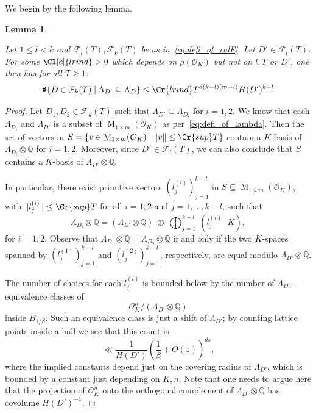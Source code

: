 \documentclass{amsart}
\newtheorem{lemma}[theorem]{Lemma}
\theoremstyle{definition}
\theoremstyle{remark}
\newcommand{\OK}{\mathcal{O}_K}
\newcommand{\Q}{\mathbb{Q}}
\DeclareMathOperator{\M}{M}
\DeclareMathOperator{\card}{\texttt{\#}}
\begin{document}
We begin by the following lemma.
\begin{lemma}
    \label{le:low_rank_induction}

    Let $1 \leq l < k$ and $\mathcal{F}_{l}(T), \mathcal{F}_{k}(T)$ be as in~\cref{eq:defi_of_calF}. 
    Let $D' \in \mathcal{F}_{l}{(T)}$.
    For some $\Cl[c]{lrind} > 0$ which 
    depends on 
    $\rho(\OK)$ but not on $l,T$ or $D'$,
    one then has for all $T \geq 1$:
    \begin{equation}
        \card \{D \in \mathcal{F}_{k}(T) \mid \Lambda_{D'} \subseteq \Lambda_{D} \} \leq \Cr{lrind}T^{d(k-l)(m-l)} H(D')^{k-l}
    \end{equation}
\end{lemma}
\begin{proof}
    Let $D_1,D_2\in \mathcal{F}_{k}(T)$ such that $\Lambda_{D'} \subseteq \Lambda_{D_i}$ for $i=1,2$. 
    We know that each $\Lambda_{D_{i}}$ and $\Lambda_{D'}$ is a subset of $\M_{1 \times m}(\OK)$
    as per~\cref{eq:defi_of_lambda}.
    Then the set of vectors in $S=\{v \in \M_{1 \times m}(\OK) \mid  \|v\| \leq \Cr{sup} T\}$
    contain a $K$-basis of $\Lambda_{D_i} \otimes \mathbb{Q}$ for $i=1,2$. 
    Moreover, since $D' \in \mathcal{F}_{l}(T)$, we can also conclude that $S$ contains a $K$-basis of $\Lambda_{D'} \otimes \mathbb{Q}$.

    In particular, there exist primitive vectors $(l_j^{(i)})_{j=1}^{k-l}$ in $S \subseteq \M_{1 \times m}(\OK)$, 
    with $\lVert l_j^{(i)}\rVert\leq  \Cr{sup} T $ for all $i=1,2$ and $j=1,\dots,k-l$, such that
    $$\Lambda_{D_i}\otimes\Q=(\Lambda_{D'}\otimes\Q)~ \oplus ~\bigoplus_{j=1}^{k-l}\ (l_j^{(i)}\cdot K), $$for $i=1,2$. 
    Observe that $\Lambda_{D_1}\otimes\Q=\Lambda_{D_2}\otimes\Q$ if and only if the two $K$-spaces spanned by $(l_j^{(1)})_{j=1}^{k-l}$ and $(l_j^{(2)})_{j=1}^{k-l}$,  respectively, are equal modulo $\Lambda_{D'}\otimes\Q$.

    \iffalse
        The number of choices for each $l_j^{(i)}$ is bounded below by the number of $\Lambda_{D'}$-equivalence classes of$$ \mathcal{O}_K^n/(\Lambda_{D'}\otimes\Q)$$
        inside $B_{1/\beta}$. Such an equivalence class is just a shift of $\Lambda_{D'}$; by counting lattice points inside a ball we see that this count is 
        \begin{equation}
            \label{eq:count_upto_equiv}
            \ll \frac{1}{H(D')}\left(\frac{1}{\beta}+O(1)\right)^{ds},    
        \end{equation}
        where the implied constants depend just on the covering radius of $\Lambda_{D'}$, which is bounded by a constant just depending on $K,n$.
        Note that one needs to argue here that the projection of $\OK^n$ onto the orthogonal complement of $\Lambda_{D'} \otimes \mathbb{Q}$ has covolume $H(D')^{-1}$.



\end{proof}
\end{document}
